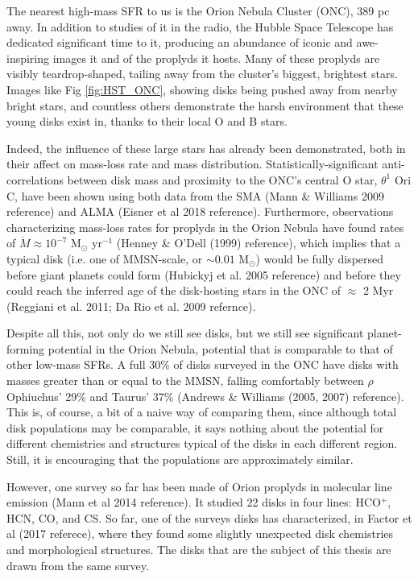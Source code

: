 The nearest high-mass SFR to us is the Orion Nebula Cluster (ONC), 389 pc away. In addition to studies of it in the radio, the Hubble Space Telescope has dedicated significant time to it, producing an abundance of iconic and awe-inspiring images it and of the proplyds it hosts. Many of these proplyds are visibly teardrop-shaped, tailing away from the cluster's biggest, brightest stars. Images like Fig \ref{fig:HST_ONC}, showing disks being pushed away from nearby bright stars, and countless others demonstrate the harsh environment that these young disks exist in, thanks to their local O and B stars.

Indeed, the influence of these large stars has already been demonstrated, both in their affect on mass-loss rate and mass distribution. Statistically-significant anti-correlations between disk mass and proximity to the ONC's central O star, $\theta^1$ Ori C, have been shown using both data from the SMA (Mann & Williams 2009 reference) and ALMA (Eisner et al 2018 reference). Furthermore, observations characterizing mass-loss rates for proplyds in the Orion Nebula have found rates of $\dot{M} \approx 10^{-7}$ M$_{\odot}$ yr$^{-1}$ (Henney \& O'Dell (1999) reference), which implies that a typical disk (i.e. one of MMSN-scale, or $\sim0.01$ M$_{\odot}$) would be fully dispersed before giant planets could form (Hubickyj et al. 2005 reference) and before they could reach the inferred age of the disk-hosting stars in the ONC of $\approx$ 2 Myr (Reggiani et al. 2011; Da Rio et al. 2009 refernce).

Despite all this, not only do we still see disks, but we still see significant planet-forming potential in the Orion Nebula, potential that is comparable to that of other low-mass SFRs. A full 30\% of disks surveyed in the ONC have disks with masses greater than or equal to the MMSN, falling comfortably between $\rho$ Ophiuchus' 29\% and Taurus' 37\% (Andrews & Williams (2005, 2007) reference). This is, of course, a bit of a naive way of comparing them, since although total disk populations may be comparable, it says nothing about the potential for different chemistries and structures typical of the disks in each different region. Still, it is encouraging that the populations are approximately similar.

However, one survey so far has been made of Orion proplyds in molecular line emission (Mann et al 2014 reference).
It studied 22 disks in four lines: HCO$^+$, HCN, CO, and CS. So far, one of the surveys disks has characterized, in Factor et al (2017 referece), where they found some slightly unexpected disk chemistries and morphological structures. The disks that are the subject of this thesis are drawn from the same survey.




